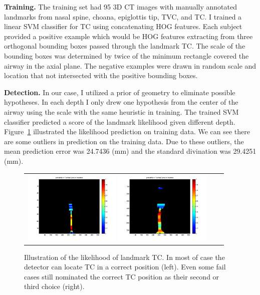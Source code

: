 {\bf Training.} 
The training set had 95 3D CT images with manually annotated landmarks from nasal spine, choana, epiglottis tip, TVC, and TC.
I trained a linear SVM classifier for TC using concatenating HOG features.
Each subject provided a positive example which would be HOG features extracting from three orthogonal bounding boxes passed through the landmark TC.
The scale of the bounding boxes was determined by twice of the minimum rectangle covered the airway in the axial plane.
The negative examples were drawn in random scale and location that not intersected with the positive bounding boxes.

{\bf Detection.}
In our case, I utilized a prior of geometry to eliminate possible hypotheses.
In each depth I only drew one hypothesis from the center of the airway using the scale with the same heuristic in training.
The trained SVM classifier predicted a score of the landmark likelihood given different depth.
Figure~\ref{fig:landmark_detection} illustrated the likelihood prediction on training data.
We can see there are some outliers in prediction on the training data.
Due to these outliers, the mean prediction error was 24.7436 (mm) and the standard divination was 29.4251 (mm).

\begin{figure}[tb]
  \begin{center}
    \begin{tabular}{ccc}
    \includegraphics[height=35mm] {fig/CRL02_TracheaCarina_left.png}
    \includegraphics[height=35mm] {fig/CRL04_TracheaCarina_left.png}
    \end{tabular}
    \caption{ \label{fig:landmark_detection} Illustration of the likelihood of landmark TC. In most of case the detector can locate TC in a correct position (left). Even some fail cases still nominated the correct TC position as their second or third choice (right).
    }
  \end{center}
\end{figure}

